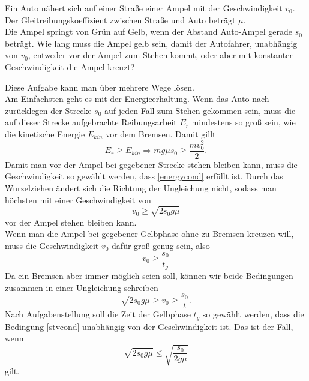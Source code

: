 \begin{Exercise}[label = ampel, title = Gute Ampel, difficulty = 2, origin = Alte IPhO-Aufgabe ]
	Ein Auto nähert sich auf einer Straße einer Ampel mit der Geschwindigkeit $v_0$.  Der Gleitreibungskoeffizient zwischen Straße und Auto beträgt $\mu$.\\ Die Ampel springt von Grün auf Gelb, wenn der Abstand Auto-Ampel gerade $s_0$ beträgt. Wie lang muss die Ampel gelb sein, damit der Autofahrer, unabhängig von $v_0$, entweder vor der Ampel zum Stehen kommt, oder aber mit konstanter Geschwindigkeit die Ampel kreuzt?
\end{Exercise}	
\begin{Answer}[ref = ampel]
	Diese Aufgabe kann man über mehrere Wege lösen.\\
	 Am Einfachsten geht es mit der Energieerhaltung. Wenn das Auto nach zurücklegen der Strecke $s_0$ auf jeden Fall zum Stehen gekommen sein, muss die auf dieser Strecke aufgebrachte Reibungsarbeit $E_r$ mindestens so groß sein, wie die kinetische Energie $E_{kin}$ vor dem Bremsen. Damit gillt
	 \begin{equation}\label{energycond}
	 E_{r} \geq E_{kin} \Rightarrow mg\mu s_0 \geq \frac{mv_0^2}{2}.
	 \end{equation}
	 Damit man vor der Ampel bei gegebener Strecke stehen bleiben kann, muss die Geschwindigkeit so gewählt werden, dass \eqref{energycond} erfüllt ist. Durch das Wurzelziehen ändert sich die Richtung der Ungleichung nicht, sodass man höchsten mit einer Geschwindigkeit von 
	 \begin{equation}\label{vfriccond}
	 	v_0\geq \sqrt{2s_0g\mu}
	 \end{equation}
	 vor der Ampel stehen bleiben kann.\\
	 Wenn man die Ampel bei gegebener Gelbphase ohne zu Bremsen kreuzen will, muss die Geschwindigkeit $v_0$ dafür groß genug sein, also
	 \begin{equation}\label{velcond}
	 	v_0 \geq  \frac{s_0}{t_g}
	 \end{equation}
	Da ein Bremsen aber immer möglich seien soll, können wir beide Bedingungen zusammen in einer Ungleichung schreiben
	\begin{equation}\label{stvcond}
		\sqrt{2s_0g\mu}\geq v_0 \geq \frac{s_0}{t}.
	\end{equation}
	Nach Aufgabenstellung soll die Zeit der Gelbphase $t_g$ so gewählt werden, dass die Bedingung \eqref{stvcond} unabhängig von der Geschwindigkeit ist. Das ist der Fall, wenn
	\begin{equation}\label{energytcond}
	\boxed{
	\sqrt{2s_0g\mu} \leq \sqrt{\frac{s_0}{2g\mu}}}
	\end{equation}
	gilt.
\end{Answer}